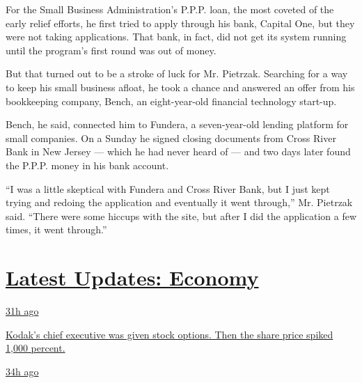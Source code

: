 For the Small Business Administration's P.P.P. loan, the most coveted of
the early relief efforts, he first tried to apply through his bank,
Capital One, but they were not taking applications. That bank, in fact,
did not get its system running until the program's first round was out
of money.

But that turned out to be a stroke of luck for Mr. Pietrzak. Searching
for a way to keep his small business afloat, he took a chance and
answered an offer from his bookkeeping company, Bench, an eight-year-old
financial technology start-up.

Bench, he said, connected him to Fundera, a seven-year-old lending
platform for small companies. On a Sunday he signed closing documents
from Cross River Bank in New Jersey --- which he had never heard of ---
and two days later found the P.P.P. money in his bank account.

``I was a little skeptical with Fundera and Cross River Bank, but I just
kept trying and redoing the application and eventually it went
through,'' Mr. Pietrzak said. ``There were some hiccups with the site,
but after I did the application a few times, it went through.''

\hypertarget{latest-updates-economy}{%
\section{\texorpdfstring{\href{https://www.nytimes3xbfgragh.onion/live/2020/07/31/business/stock-market-today-coronavirus?action=click\&pgtype=Article\&state=default\&region=MAIN_CONTENT_1\&context=storylines_live_updates}{Latest
Updates:
Economy}}{Latest Updates: Economy}}\label{latest-updates-economy}}

\href{https://www.nytimes3xbfgragh.onion/live/2020/07/31/business/stock-market-today-coronavirus?action=click\&pgtype=Article\&state=default\&region=MAIN_CONTENT_1\&context=storylines_live_updates\#kodaks-chief-executive-was-given-stock-options-then-the-share-price-spiked-1000-percent}{31h
ago}

\href{https://www.nytimes3xbfgragh.onion/live/2020/07/31/business/stock-market-today-coronavirus?action=click\&pgtype=Article\&state=default\&region=MAIN_CONTENT_1\&context=storylines_live_updates\#kodaks-chief-executive-was-given-stock-options-then-the-share-price-spiked-1000-percent}{Kodak's
chief executive was given stock options. Then the share price spiked
1,000 percent.}

\href{https://www.nytimes3xbfgragh.onion/live/2020/07/31/business/stock-market-today-coronavirus?action=click\&pgtype=Article\&state=default\&region=MAIN_CONTENT_1\&context=storylines_live_updates\#fitch-ratings-downgrades-its-outlook-on-us-debt}{34h
ago}

